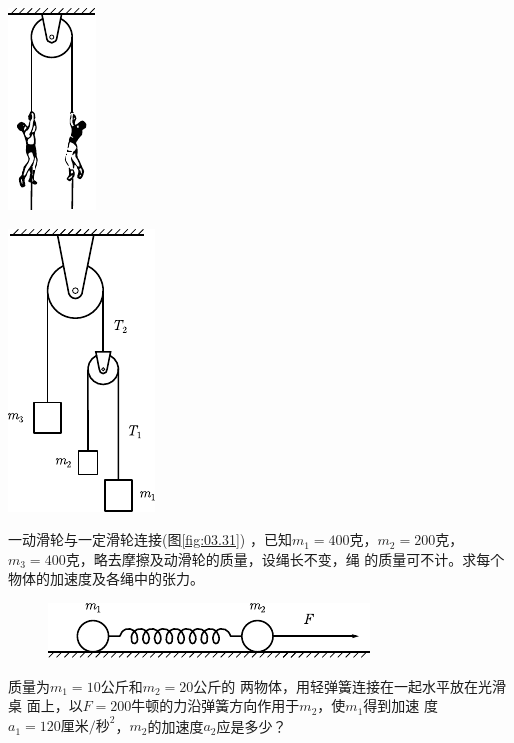 \begin{exercises}
\begin{figurex}
	\begin{minipage}[b]{0.4\linewidth}
		\centering
		\includegraphics{figure/fig03.30}
		\caption{}
		\label{fig:03.30}
	\end{minipage}
	\begin{minipage}[b]{0.6\linewidth}
		\centering
		\includegraphics{figure/fig03.31}
		\caption{}
		\label{fig:03.31}
	\end{minipage}
	\vspace{-1.56em}
\end{figurex}
\exercise 一动滑轮与一定滑轮连接(图\ref{fig:03.31}) ，已知$  m _ { 1 } = 4 0 0  $克，$  m _ { 2 } = 2 0 0  $克，$  m _ { 3 } = 4 0 0  $克，略去摩擦及动滑轮的质量，设绳长不变，绳
的质量可不计。求每个物体的加速度及各绳中的张力。

\begin{figure}
	\centering
	\includegraphics{figure/fig03.32}
	\caption{}
	\label{fig:03.32}
\end{figure}
\exercise 质量为$  m _ { 1 } = 1 0  $公斤和$  m _ { 2 } = 2 0  $公斤的
两物体，用轻弹簧连接在一起水平放在光滑桌
面上，以$  F = 2 0 0  $牛顿的力沿弹簧方向作用于$  m _ { 2 }  $，使$  m _ { 1 }  $得到加速
度$  a _ { 1 } = 1 2 0 \text{厘米/秒}^2 $，$  m _ { 2 }  $的加速度$  a _ { 2 }  $应是多少？


\end{exercises}
